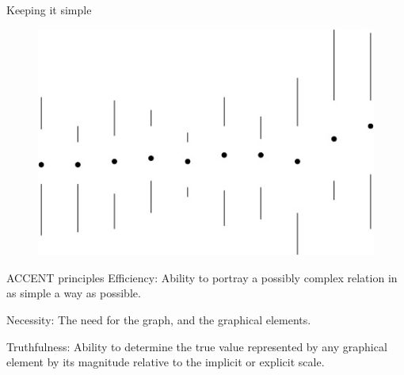 \documentclass[12pt,english,pdf,dvipsnames,handout]{beamer}
\begin{document}
\begin{frame}{Keeping it simple}

\begin{figure}
	\centering
	\includegraphics[scale=0.75]{../04-graphs/30_Clean_boxplot}
\end{figure}

\end{frame}





\begin{frame}{ACCENT principles}
  \textcolor{title}{E}fficiency: Ability to portray a possibly complex relation in as simple a way as possible.\bigskip

  \pause

  \textcolor{title}{N}ecessity: The need for the graph, and the graphical elements.\bigskip

  \pause

  \textcolor{title}{T}ruthfulness: Ability to determine the true value represented by any graphical element by its magnitude relative to the implicit or explicit scale.
\end{frame}
\end{document}
